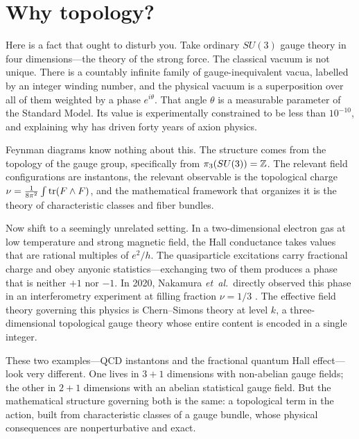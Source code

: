 \vspace{1em}

\section{Why topology?}\label{sec:scope}

Here is a fact that ought to disturb you.  Take ordinary $SU(3)$ gauge theory in four dimensions---the theory of the strong force.  The classical vacuum is not unique.  There is a countably infinite family of gauge-inequivalent vacua, labelled by an integer winding number, and the physical vacuum is a superposition over all of them weighted by a phase $e^{i\theta}$.  That angle $\theta$ is a measurable parameter of the Standard Model.  Its value is experimentally constrained to be less than $10^{-10}$, and explaining why has driven forty years of axion physics.

Feynman diagrams know nothing about this.  The structure comes from the topology of the gauge group, specifically from $\pi_3(SU(3)) = \mathbb{Z}$.  The relevant field configurations are instantons, the relevant observable is the topological charge $\nu = \frac{1}{8\pi^2}\int \operatorname{tr}(F\wedge F)$, and the mathematical framework that organizes it is the theory of characteristic classes and fiber bundles.

Now shift to a seemingly unrelated setting.  In a two-dimensional electron gas at low temperature and strong magnetic field, the Hall conductance takes values that are rational multiples of $e^2/h$.  The quasiparticle excitations carry fractional charge and obey anyonic statistics---exchanging two of them produces a phase that is neither $+1$ nor $-1$.  In 2020, Nakamura \emph{et~al.}\ directly observed this phase in an interferometry experiment at filling fraction $\nu = 1/3$ \cite{Nakamura2020AnyonicBraiding}.  The effective field theory governing this physics is Chern--Simons theory at level $k$, a three-dimensional topological gauge theory whose entire content is encoded in a single integer.

These two examples---QCD instantons and the fractional quantum Hall effect---look very different.  One lives in $3{+}1$ dimensions with non-abelian gauge fields; the other in $2{+}1$ dimensions with an abelian statistical gauge field.  But the mathematical structure governing both is the same: a topological term in the action, built from characteristic classes of a gauge bundle, whose physical consequences are nonperturbative and exact.

